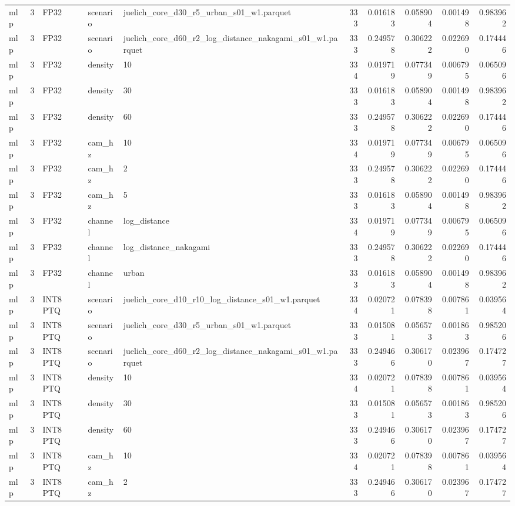 \begin{tabular}{lrlllrrrrr}
mlp & 3 & FP32 & scenario & juelich\_core\_d30\_r5\_urban\_s01\_w1.parquet & 333 & 0.016183 & 0.058904 & 0.001498 & 0.983962 \\
mlp & 3 & FP32 & scenario & juelich\_core\_d60\_r2\_log\_distance\_nakagami\_s01\_w1.parquet & 333 & 0.249578 & 0.306222 & 0.022690 & 0.174446 \\
mlp & 3 & FP32 & density & 10 & 334 & 0.019719 & 0.077349 & 0.006795 & 0.065096 \\
mlp & 3 & FP32 & density & 30 & 333 & 0.016183 & 0.058904 & 0.001498 & 0.983962 \\
mlp & 3 & FP32 & density & 60 & 333 & 0.249578 & 0.306222 & 0.022690 & 0.174446 \\
mlp & 3 & FP32 & cam\_hz & 10 & 334 & 0.019719 & 0.077349 & 0.006795 & 0.065096 \\
mlp & 3 & FP32 & cam\_hz & 2 & 333 & 0.249578 & 0.306222 & 0.022690 & 0.174446 \\
mlp & 3 & FP32 & cam\_hz & 5 & 333 & 0.016183 & 0.058904 & 0.001498 & 0.983962 \\
mlp & 3 & FP32 & channel & log\_distance & 334 & 0.019719 & 0.077349 & 0.006795 & 0.065096 \\
mlp & 3 & FP32 & channel & log\_distance\_nakagami & 333 & 0.249578 & 0.306222 & 0.022690 & 0.174446 \\
mlp & 3 & FP32 & channel & urban & 333 & 0.016183 & 0.058904 & 0.001498 & 0.983962 \\
mlp & 3 & INT8 PTQ & scenario & juelich\_core\_d10\_r10\_log\_distance\_s01\_w1.parquet & 334 & 0.020721 & 0.078398 & 0.007861 & 0.039564 \\
mlp & 3 & INT8 PTQ & scenario & juelich\_core\_d30\_r5\_urban\_s01\_w1.parquet & 333 & 0.015081 & 0.056573 & 0.001863 & 0.985206 \\
mlp & 3 & INT8 PTQ & scenario & juelich\_core\_d60\_r2\_log\_distance\_nakagami\_s01\_w1.parquet & 333 & 0.249466 & 0.306170 & 0.023967 & 0.174727 \\
mlp & 3 & INT8 PTQ & density & 10 & 334 & 0.020721 & 0.078398 & 0.007861 & 0.039564 \\
mlp & 3 & INT8 PTQ & density & 30 & 333 & 0.015081 & 0.056573 & 0.001863 & 0.985206 \\
mlp & 3 & INT8 PTQ & density & 60 & 333 & 0.249466 & 0.306170 & 0.023967 & 0.174727 \\
mlp & 3 & INT8 PTQ & cam\_hz & 10 & 334 & 0.020721 & 0.078398 & 0.007861 & 0.039564 \\
mlp & 3 & INT8 PTQ & cam\_hz & 2 & 333 & 0.249466 & 0.306170 & 0.023967 & 0.174727 \\

\end{tabular}
